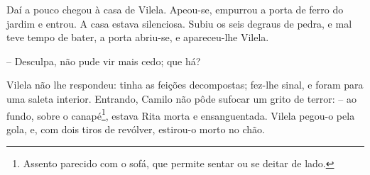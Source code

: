 Daí a pouco chegou à casa de Vilela. Apeou-se, empurrou a porta de ferro
do jardim e entrou. A casa estava silenciosa. Subiu os seis degraus de
pedra, e mal teve tempo de bater, a porta abriu-se, e apareceu-lhe
Vilela.

-- Desculpa, não pude vir mais cedo; que há?

Vilela não lhe respondeu: tinha as feições decompostas; fez-lhe sinal, e
foram para uma saleta interior. Entrando, Camilo não pôde sufocar um
grito de terror: -- ao fundo, sobre o canapé\footnote{Assento parecido
  com o sofá, que permite sentar ou se deitar de lado.}, estava Rita
morta e ensanguentada. Vilela pegou-o pela gola, e, com dois tiros de
revólver, estirou-o morto no chão.
